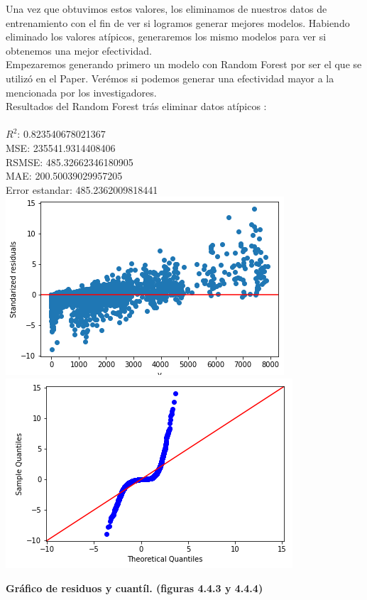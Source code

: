 \documentclass{article}
\begin{document}
        
        
        Una vez que obtuvimos estos valores, los eliminamos de nuestros datos de entrenamiento con el fin de ver si logramos generar mejores modelos. Habiendo eliminado los valores atípicos, generaremos los mismo modelos para ver si obtenemos una mejor efectividad.\\
        
        Empezaremos generando primero un modelo con Random Forest por ser el que se utilizó en el Paper. Verémos si podemos generar una efectividad mayor a la mencionada por los investigadores.\\
        
        Resultados del Random Forest trás eliminar datos atípicos
        :\\
            \\
                $R^2$:  0.823540678021367\\
                MSE:  235541.9314408406\\
                RSMSE:  485.32662346180905\\
                MAE:  200.50039029957205\\
                Error estandar:  485.2362009818441\\
        
                \includegraphics[scale=0.6]{images/residuos-discharge-randomforest2.PNG} 
                \includegraphics[scale=0.6]{images/residuos-discharge-RFR-quantil.PNG} \\
                \begin{center}
                    \textbf{Gráfico de residuos y cuantíl. (figuras 4.4.3 y 4.4.4)}
                \end{center}
        
\end{document}
